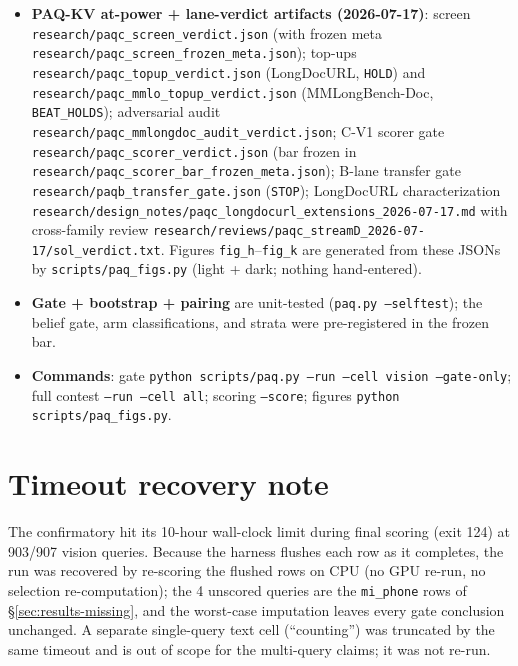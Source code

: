 \documentclass[11pt,letterpaper]{article}
\newcommand{\paqc}{\textsc{PAQ-KV}}
\begin{document}
\begin{itemize}
        \texttt{scripts/paqc\_spike.py} with \texttt{research/paqc\_spike\_test\{A,B\}.json} and
        \texttt{research/paqc\_identity\_audit.json}; B-lane design
        \texttt{research/design\_notes/paqt\_lora\_calibration\_design\_2026-07-16.md} (incl.\
        the folded review addenda) and data/harness spec
        \texttt{research/design\_notes/paqb\_data\_harness\_spec\_2026-07-16.md}
        (\texttt{scripts/paqb\_prep.py}; sealed fresh pin + provenance index). Review archive:
        \texttt{research/reviews/paqt\_2026-07-16/}.
  \item \textbf{\paqc{} at-power + lane-verdict artifacts (2026-07-17)}: screen
        \texttt{research/paqc\_screen\_verdict.json} (with frozen meta
        \texttt{research/paqc\_screen\_frozen\_meta.json}); top-ups
        \texttt{research/paqc\_topup\_verdict.json} (LongDocURL, \texttt{HOLD}) and
        \texttt{research/paqc\_mmlo\_topup\_verdict.json} (MMLongBench-Doc,
        \texttt{BEAT\_HOLDS}); adversarial audit
        \texttt{research/paqc\_mmlongdoc\_audit\_verdict.json}; C-V1 scorer gate
        \texttt{research/paqc\_scorer\_verdict.json} (bar frozen in
        \texttt{research/paqc\_scorer\_bar\_frozen\_meta.json}); B-lane transfer gate
        \texttt{research/paqb\_transfer\_gate.json} (\texttt{STOP}); LongDocURL
        characterization
        \texttt{research/design\_notes/paqc\_longdocurl\_extensions\_2026-07-17.md} with
        cross-family review
        \texttt{research/reviews/paqc\_streamD\_2026-07-17/sol\_verdict.txt}. Figures
        \texttt{fig\_h}--\texttt{fig\_k} are generated from these JSONs by
        \texttt{scripts/paq\_figs.py} (light + dark; nothing hand-entered).
  \item \textbf{Gate + bootstrap + pairing} are unit-tested (\texttt{paq.py --selftest}); the
        belief gate, arm classifications, and strata were pre-registered in the frozen bar.
  \item \textbf{Commands}: gate \texttt{python scripts/paq.py --run --cell vision --gate-only};
        full contest \texttt{--run --cell all}; scoring \texttt{--score}; figures
        \texttt{python scripts/paq\_figs.py}.
\end{itemize}

\section{Timeout recovery note}\label{app:timeout}
The confirmatory hit its 10-hour wall-clock limit during final scoring (exit 124) at 903/907
vision queries. Because the harness flushes each row as it completes, the run was recovered by
re-scoring the flushed rows on CPU (no GPU re-run, no selection re-computation); the 4 unscored
queries are the \texttt{mi\_phone} rows of \S\ref{sec:results-missing}, and the worst-case
imputation leaves every gate conclusion unchanged. A separate single-query text cell
(``counting'') was truncated by the same timeout and is out of scope for the multi-query claims;
it was not re-run.



\end{document}
